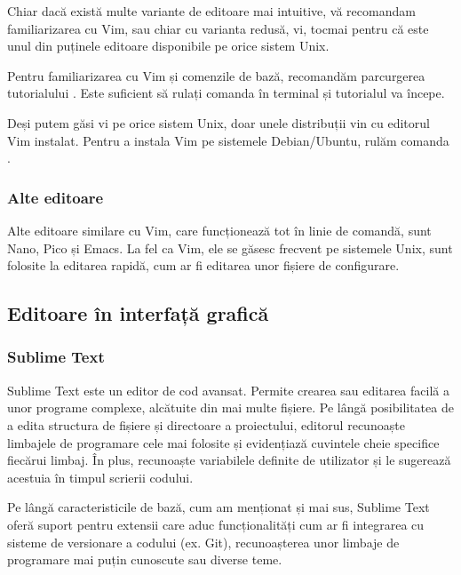 Chiar dacă există multe variante de editoare mai intuitive, vă recomandam
familiarizarea cu Vim, sau chiar cu varianta redusă, vi, tocmai pentru că este
unul din puținele editoare disponibile pe orice sistem Unix.

Pentru familiarizarea cu Vim și comenzile de bază, recomandăm parcurgerea
tutorialului . Este suficient să rulați comanda  în terminal și
tutorialul va începe.

Deși putem găsi vi pe orice sistem Unix, doar unele distribuții vin cu editorul
Vim instalat. Pentru a instala Vim pe sistemele Debian/Ubuntu, rulăm comanda .

\subsubsection{Alte editoare}
\label{sec:appdev:dev:editor:other}

Alte editoare similare cu Vim, care funcționează tot în linie de comandă, sunt
Nano, Pico și Emacs. La fel ca Vim, ele se găsesc frecvent pe sistemele Unix, sunt
folosite la editarea rapidă, cum ar fi editarea unor fișiere de configurare.

\subsection{Editoare în interfață grafică}
\label{sec:appdev:dev:editor-gui}

\subsubsection{Sublime Text}
\label{sec:appdev:dev:editor-gui:sublime}

Sublime Text este un editor de cod avansat. Permite crearea sau editarea
facilă a unor programe complexe, alcătuite din mai multe fișiere. Pe lângă
posibilitatea de a edita structura de fișiere și directoare a proiectului,
editorul recunoaște limbajele de programare cele mai folosite și evidențiază
cuvintele cheie specifice fiecărui limbaj. În plus, recunoaște variabilele
definite de utilizator și le sugerează acestuia în timpul scrierii codului.

Pe lângă caracteristicile de bază, cum am menționat și mai sus, Sublime Text
oferă suport pentru extensii care aduc funcționalități cum ar fi integrarea cu sisteme de
versionare a codului (ex. Git), recunoașterea unor limbaje de programare mai
puțin cunoscute sau diverse teme.

